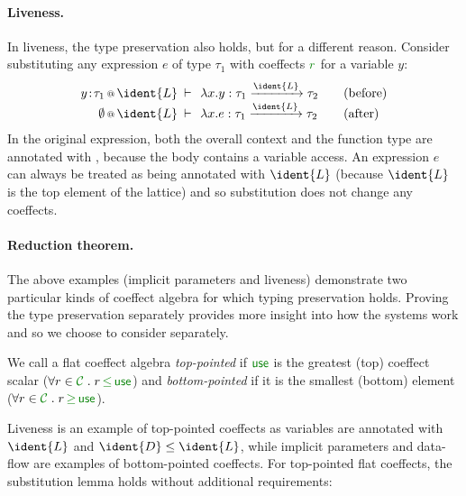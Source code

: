 \paragraph{Liveness.} In liveness, the type preservation also holds, but for a different reason. Consider
substituting any expression $e$ of type $\tau_1$ with coeffects $\cclrd{r}$ for a variable $y$:
%
\begin{equation*}
\begin{array}{rclcl}
 \coctx{y\!:\!\tau_1}{\ident{L}} &\narrow{\vdash}& \lambda x.y : \tau_1 \xrightarrow{\ident{L}} \tau_2 & & (\textnormal{before}) \\
 \coctx{\emptyset}{\ident{L}} &\narrow{\vdash}& \lambda x.e : \tau_1 \xrightarrow{\ident{L}} \tau_2 & & (\textnormal{after}) \\
\end{array}
\end{equation*}
%
In the original expression, both the overall context and the function type are annotated with , 
because the body contains a variable access. An expression $e$ can always be treated as being annotated
with $\ident{L}$ (because $\ident{L}$ is the top element of the lattice) and so substitution does not
change any coeffects.

\paragraph{Reduction theorem.}
The above examples (implicit parameters and liveness) demonstrate two particular kinds of coeffect 
algebra for which typing preservation holds. Proving the type preservation separately provides 
more insight into how the systems work and so we choose to consider separately. 

\begin{definition}
We call a flat coeffect algebra \emph{top-pointed} if $\cunit$ is the greatest (top) coeffect scalar
($\forall r \in \C \;.\; r \,\cleq\, \cunit $) and \emph{bottom-pointed} if it is the smallest (bottom) 
element ($\forall r \in \C \;.\; r \,\cgeq\, \cunit $).
\end{definition}

\noindent
Liveness is an example of top-pointed coeffects as variables are annotated with 
$\ident{L}$ and $\ident{D} \leq \ident{L}$, while implicit parameters and data-flow are examples
of bottom-pointed coeffects. For top-pointed flat coeffects, the substitution lemma holds without 
additional requirements:

